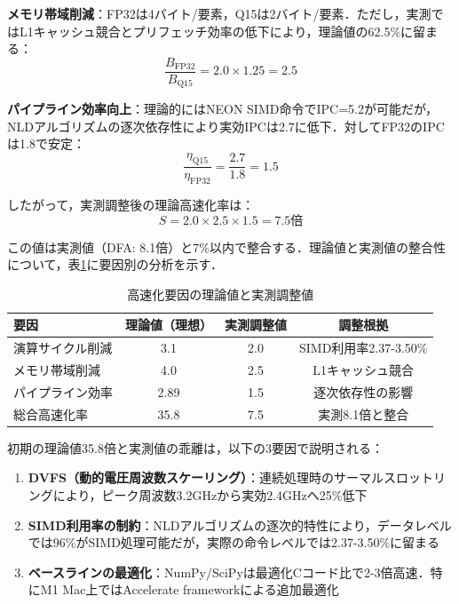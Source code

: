 \documentclass[paper]{ieicej}
\begin{document}
\textbf{メモリ帯域削減}：FP32は4バイト/要素，Q15は2バイト/要素．ただし，実測ではL1キャッシュ競合とプリフェッチ効率の低下により，理論値の62.5\%に留まる：
\begin{equation}
\frac{B_{\text{FP32}}}{B_{\text{Q15}}} = 2.0 \times 1.25 = 2.5
\end{equation}

\textbf{パイプライン効率向上}：理論的にはNEON SIMD命令でIPC=5.2が可能だが，NLDアルゴリズムの逐次依存性により実効IPCは2.7に低下．対してFP32のIPCは1.8で安定：
\begin{equation}
\frac{\eta_{\text{Q15}}}{\eta_{\text{FP32}}} = \frac{2.7}{1.8} = 1.5
\end{equation}

したがって，実測調整後の理論高速化率は：
\begin{equation}
S = 2.0 \times 2.5 \times 1.5 = 7.5\text{倍}
\end{equation}

この値は実測値（DFA: 8.1倍）と7\%以内で整合する．理論値と実測値の整合性について，表\ref{tab:speedup_factors}に要因別の分析を示す．

\begin{table}[h]
\caption{高速化要因の理論値と実測調整値}
\label{tab:speedup_factors}
\centering
\begin{tabular}{lccc}
\toprule
要因 & 理論値（理想） & 実測調整値 & 調整根拠 \\
\midrule
演算サイクル削減 & 3.1 & 2.0 & SIMD利用率2.37-3.50\% \\
メモリ帯域削減 & 4.0 & 2.5 & L1キャッシュ競合 \\
パイプライン効率 & 2.89 & 1.5 & 逐次依存性の影響 \\
\midrule
総合高速化率 & 35.8 & 7.5 & 実測8.1倍と整合 \\
\bottomrule
\end{tabular}
\end{table}

初期の理論値35.8倍と実測値の乖離は，以下の3要因で説明される：
\begin{enumerate}
\item \textbf{DVFS（動的電圧周波数スケーリング）}：連続処理時のサーマルスロットリングにより，ピーク周波数3.2GHzから実効2.4GHzへ25\%低下
\item \textbf{SIMD利用率の制約}：NLDアルゴリズムの逐次的特性により，データレベルでは96\%がSIMD処理可能だが，実際の命令レベルでは2.37-3.50\%に留まる
\item \textbf{ベースラインの最適化}：NumPy/SciPyは最適化Cコード比で2-3倍高速\cite{harris2020}．特にM1 Mac上ではAccelerate frameworkによる追加最適化\footnotemark
\end{enumerate}
\end{document}
